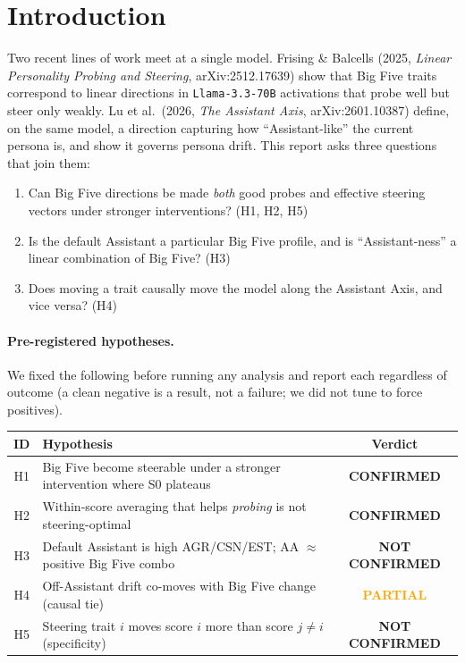 \documentclass[11pt]{article}
\newcommand{\PASS}{\textcolor{pass}{\textbf{CONFIRMED}}}
\newcommand{\FAIL}{\textcolor{fail}{\textbf{NOT CONFIRMED}}}
\newcommand{\PART}{\textcolor{orange}{\textbf{PARTIAL}}}
\begin{document}
\section{Introduction}
Two recent lines of work meet at a single model. Frising \& Balcells (2025,
\emph{Linear Personality Probing and Steering}, arXiv:2512.17639) show that Big
Five traits correspond to linear directions in \texttt{Llama-3.3-70B} activations
that probe well but steer only weakly. Lu et al.\ (2026, \emph{The Assistant
Axis}, arXiv:2601.10387) define, on the same model, a direction capturing how
``Assistant-like'' the current persona is, and show it governs persona drift. This
report asks three questions that join them:
\begin{enumerate}
  \item Can Big Five directions be made \emph{both} good probes and effective
        steering vectors under stronger interventions? (H1, H2, H5)
  \item Is the default Assistant a particular Big Five profile, and is
        ``Assistant-ness'' a linear combination of Big Five? (H3)
  \item Does moving a trait causally move the model along the Assistant Axis, and
        vice versa? (H4)
\end{enumerate}

\paragraph{Pre-registered hypotheses.} We fixed the following before running any
analysis and report each regardless of outcome (a clean negative is a result, not
a failure; we did not tune to force positives).
\begin{center}
\small
\begin{tabular}{@{}clc@{}}
\toprule
ID & Hypothesis & Verdict \\
\midrule
H1 & Big Five become steerable under a stronger intervention where S0 plateaus & \PASS \\
H2 & Within-score averaging that helps \emph{probing} is not steering-optimal & \PASS \\
H3 & Default Assistant is high AGR/CSN/EST; AA $\approx$ positive Big Five combo & \FAIL \\
H4 & Off-Assistant drift co-moves with Big Five change (causal tie) & \PART \\
H5 & Steering trait $i$ moves score $i$ more than score $j\neq i$ (specificity) & \FAIL \\
\bottomrule
\end{tabular}
\end{center}
\end{document}
